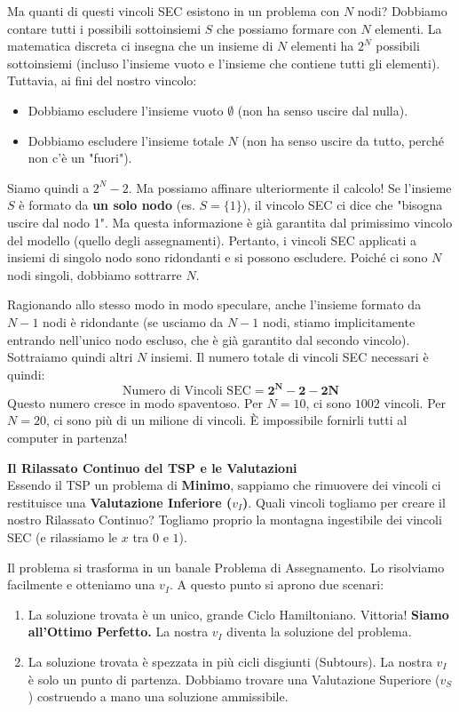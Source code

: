 \documentclass[12pt, a4paper]{article}
\begin{document}
	Ma quanti di questi vincoli SEC esistono in un problema con $N$ nodi?
	Dobbiamo contare tutti i possibili sottoinsiemi $S$ che possiamo formare con $N$ elementi. La matematica discreta ci insegna che un insieme di $N$ elementi ha $2^N$ possibili sottoinsiemi (incluso l'insieme vuoto e l'insieme che contiene tutti gli elementi).
	Tuttavia, ai fini del nostro vincolo:
	\begin{itemize}[label=$\circ$, itemsep=2pt, leftmargin=1.5cm]
		\item Dobbiamo escludere l'insieme vuoto $\emptyset$ (non ha senso uscire dal nulla).
		\item Dobbiamo escludere l'insieme totale $N$ (non ha senso uscire da tutto, perché non c'è un "fuori").
	\end{itemize}
	Siamo quindi a $2^N - 2$. Ma possiamo affinare ulteriormente il calcolo! Se l'insieme $S$ è formato da \textbf{un solo nodo} (es. $S=\{1\}$), il vincolo SEC ci dice che "bisogna uscire dal nodo 1". Ma questa informazione è già garantita dal primissimo vincolo del modello (quello degli assegnamenti). Pertanto, i vincoli SEC applicati a insiemi di singolo nodo sono ridondanti e si possono escludere. Poiché ci sono $N$ nodi singoli, dobbiamo sottrarre $N$.
	
	Ragionando allo stesso modo in modo speculare, anche l'insieme formato da $N-1$ nodi è ridondante (se usciamo da $N-1$ nodi, stiamo implicitamente entrando nell'unico nodo escluso, che è già garantito dal secondo vincolo). Sottraiamo quindi altri $N$ insiemi.
	Il numero totale di vincoli SEC necessari è quindi:
	\[
	\text{Numero di Vincoli SEC} = \mathbf{2^N - 2 - 2N}
	\]
	Questo numero cresce in modo spaventoso. Per $N=10$, ci sono $1002$ vincoli. Per $N=20$, ci sono più di un milione di vincoli. È impossibile fornirli tutti al computer in partenza!
	
	\vspace{0.4cm}
	\textbf{Il Rilassato Continuo del TSP e le Valutazioni}\\
	Essendo il TSP un problema di \textbf{Minimo}, sappiamo che rimuovere dei vincoli ci restituisce una \textbf{Valutazione Inferiore ($v_I$)}. 
	Quali vincoli togliamo per creare il nostro Rilassato Continuo? Togliamo proprio la montagna ingestibile dei vincoli SEC (e rilassiamo le $x$ tra $0$ e $1$). 
	
	Il problema si trasforma in un banale Problema di Assegnamento. Lo risolviamo facilmente e otteniamo una $v_I$.
	A questo punto si aprono due scenari:
	\begin{enumerate}
		\item La soluzione trovata è un unico, grande Ciclo Hamiltoniano. Vittoria! \textbf{Siamo all'Ottimo Perfetto.} La nostra $v_I$ diventa la soluzione del problema.
		\item La soluzione trovata è spezzata in più cicli disgiunti (Subtours). La nostra $v_I$ è solo un punto di partenza. Dobbiamo trovare una Valutazione Superiore ($v_S$) costruendo a mano una soluzione ammissibile.
	\end{enumerate}
	
\end{document}
